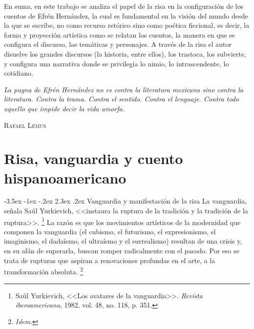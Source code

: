 \documentclass[14pt,twoside,final]{extbook} %
\makeatletter
\let\oldfootnote\footnote
\renewcommand\footnote[1]{%
\oldfootnote{\hspace{1mm}#1}}
\renewcommand\section{\@startsection {section}{1}{\z@}%
                                     {-3.5ex \@plus -1ex \@minus -.2ex}%
                                     {2.3ex \@plus .2ex}%
                                     {\normalfont\large\bfseries\sc}}
\makeatother
\begin{document}
En suma, en este trabajo se analiza el papel de la risa en la configuración de los cuentos de Efrén Hernández, la cual es fundamental en la visión del mundo desde la que se escribe, no como recurso retórico sino como poética ficcional, es decir, la forma y proyección artística como se relatan los cuentos, la manera en que se configura el discurso, las temáticas y personajes. A través de la risa el autor disuelve los grandes discursos (la historia, entre ellos), los trastoca, los subvierte, y configura una narrativa donde se privilegia lo nimio, lo intrascendente, lo cotidiano.
\newpage
\pagestyle{empty}
\null\vfill
\newpage
\pagestyle{empty}
\vspace*{42pt}
\begin{flushright}
\begin{minipage}{7.5cm} %
\emph{La pugna de Efrén Hernández no es contra la literatura mexicana sino contra la literatura. Contra la trama. Contra el sentido. Contra el lenguaje. Contra todo
aquello que impide decir la vida amorfa.}
\begin{flushright}
\textsc{Rafael Lemus}
\end{flushright}
\end{minipage}
\end{flushright}
\chapter{Risa, vanguardia y cuento hispanoamericano}\label{ch:risa-vanguardia-y-cuento-hispanoamericano}
\thispagestyle{empty}
\pagestyle{fancy}
\fancyhf{} %
\fancyhead[RO,LE]{\thepage}
\renewcommand{\headrulewidth}{0.4pt}
\setcounter{page}{25}
\section{Vanguardia y manifestación de la risa}\label{sec:vanguardia-y-manifestacion-de-la-risa}
La vanguardia, señala Saúl Yurkievich, <<instaura la ruptura de la tradición y la
tradición de la ruptura>>.\footnote{Saúl Yurkievich, <<Los avatares de la vanguardia>>. \emph{Revista iberoamericana}, 1982, vol. 48, no. 118, p. 351.} La razón es que los movimientos artísticos de la modernidad que componen la vanguardia (el cubismo, el futurismo, el expresionismo, el imaginismo, el dadaísmo, el ultraísmo y el surrealismo) resultan de una crisis y, en su afán de superarla, buscan romper radicalmente con el pasado. Por eso se trata de rupturas que aspiran a renovaciones profundas en el arte, a la transformación absoluta.\footnote{\emph{Idem}.}
\end{document}
